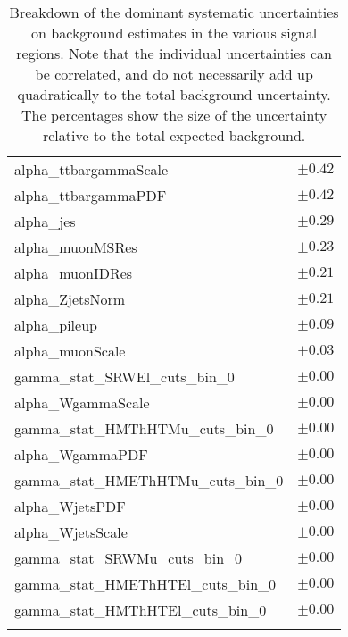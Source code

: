\begin{table}
\begin{center}
\begin{tabular*}{\textwidth}{@{\extracolsep{\fill}}lc}
alpha\_ttbargammaScale         & $\pm 0.42$       \\
alpha\_ttbargammaPDF         & $\pm 0.42$       \\
alpha\_jes         & $\pm 0.29$       \\
alpha\_muonMSRes         & $\pm 0.23$       \\
alpha\_muonIDRes         & $\pm 0.21$       \\
alpha\_ZjetsNorm         & $\pm 0.21$       \\
alpha\_pileup         & $\pm 0.09$       \\
alpha\_muonScale         & $\pm 0.03$       \\
gamma\_stat\_SRWEl\_cuts\_bin\_0         & $\pm 0.00$       \\
alpha\_WgammaScale         & $\pm 0.00$       \\
gamma\_stat\_HMThHTMu\_cuts\_bin\_0         & $\pm 0.00$       \\
alpha\_WgammaPDF         & $\pm 0.00$       \\
gamma\_stat\_HMEThHTMu\_cuts\_bin\_0         & $\pm 0.00$       \\
alpha\_WjetsPDF         & $\pm 0.00$       \\
alpha\_WjetsScale         & $\pm 0.00$       \\
gamma\_stat\_SRWMu\_cuts\_bin\_0         & $\pm 0.00$       \\
gamma\_stat\_HMEThHTEl\_cuts\_bin\_0         & $\pm 0.00$       \\
gamma\_stat\_HMThHTEl\_cuts\_bin\_0         & $\pm 0.00$       \\
\noalign{\smallskip}\hline\noalign{\smallskip}
\end{tabular*}
\end{center}
\caption[Breakdown of uncertainty on background estimates]{
Breakdown of the dominant systematic uncertainties on background estimates in the various signal regions.
Note that the individual uncertainties can be correlated, and do not necessarily add up quadratically to 
the total background uncertainty. The percentages show the size of the uncertainty relative to the total expected background.
\label{table.results.bkgestimate.uncertainties.WCRhHT}}
\end{table}
%